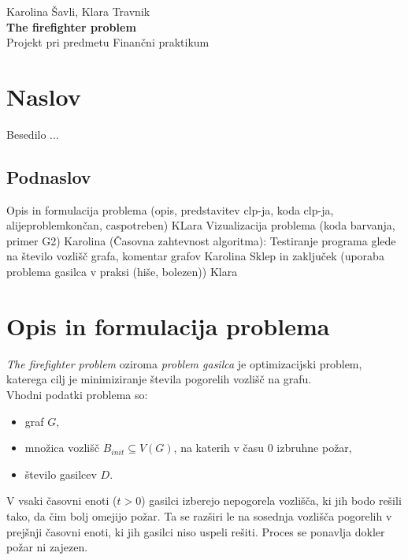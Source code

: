 \documentclass[a4paper, 12pt]{article}
\begin{document}
    
\thispagestyle{empty}
\vfill

\begin{center}{\large
Karolina Šavli, Klara Travnik\\[5mm]
{\Huge \bf The firefighter problem}\\[5mm]
Projekt pri predmetu Finančni praktikum\\[1cm]}
\end{center}
\vfill

\pagebreak


\tableofcontents

\pagebreak



\section{Naslov}
Besedilo ...

\subsection{Podnaslov}
Opis in formulacija problema (opis, predstavitev clp-ja, koda clp-ja, alijeproblemkončan, caspotreben) KLara
Vizualizacija problema (koda barvanja, primer G2) Karolina
(Časovna zahtevnost algoritma): 
Testiranje programa glede na število vozlišč grafa, komentar grafov Karolina
Sklep in zaključek (uporaba problema gasilca v praksi (hiše, bolezen)) Klara

\pagebreak

\section{Opis in formulacija problema}

\noindent \emph{The firefighter problem} oziroma \emph{problem gasilca} je optimizacijski problem, katerega cilj je 
minimiziranje števila pogorelih vozlišč na grafu. \\
Vhodni podatki problema so:
\begin{itemize}
    \item graf $G,$
    \item množica vozlišč $B_{init} \subseteq V\left(G\right)$, na katerih v času $0$ izbruhne požar,
    \item število gasilcev $D$.
\end{itemize} 
V vsaki časovni enoti ($t > 0$) gasilci izberejo nepogorela vozlišča, ki jih bodo rešili tako,
da čim bolj omejijo požar. Ta se razširi le na sosednja vozlišča pogorelih v prejšnji časovni enoti,
ki jih gasilci niso uspeli rešiti. Proces se ponavlja dokler požar ni zajezen.
\end{document}
